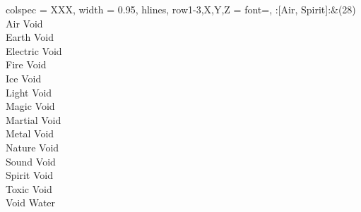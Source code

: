 \begin{longtblr}[
	caption = {2v2 Attacking Effective},
	label = {2v2-Attacking-Effective},
]{
	colspec = {XXX}, width = 0.95\linewidth,
	hlines,
	row{1-3,X,Y,Z} = {font=\bfseries},
}
	:[Air, Spirit]:&{(28)\\
	Air Void \\
	Earth Void \\
	Electric Void \\
	Fire Void \\
	Ice Void \\
	Light Void \\
	Magic Void \\
	Martial Void \\
	Metal Void \\
	Nature Void \\
	Sound Void \\
	Spirit Void \\
	Toxic Void \\
	Void Water \\
	}\\

\end{longtblr}
\onecolumn

